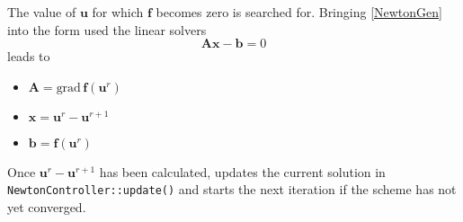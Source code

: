 The value of $\textbf{u}$ for which $\textbf{f}$ becomes zero is
searched for. Bringing \eqref{NewtonGen} into the form used the linear
solvers
\begin{equation}
\label{GenSysEq}
 \textbf{A}\textbf{x} - \textbf{b} = 0 
\end{equation}
leads to
\begin{itemize}
\item $\textbf{A} = \text{grad}\,\textbf{f} (\textbf{u}^r)$
\item $\textbf{x} = \textbf{u}^{r} - \textbf{u}^{r+1}$
\item $\textbf{b} = \textbf{f}(\textbf{u}^{r})$
\end{itemize}

Once $\textbf{u}^{r} - \textbf{u}^{r+1}$ has been calculated, \eWoms
updates the current solution in \texttt{NewtonController::update()}
and starts the next iteration if the scheme has not yet converged.

